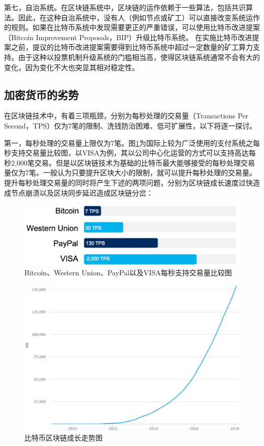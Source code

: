 				第七，自治系统。在区块链系统中，区块链的运作依赖于一些算法，包括共识算法。因此，在这种自治系统中，没有人（例如节点或矿工）可以直接改变系统运作的规则。如果在比特币系统中发现需要更正的严重错误，可以使用比特币改进提案（Bitcoin Improvement Proposals，BIP）\supercite{BitcoinImprovementProposals}升级比特币系统。 在实施比特币改进提案之前，提议的比特币改进提案需要得到比特币系统中超过一定数量的矿工算力支持。由于这种以投票机制升级系统的门槛相当高，使得区块链系统通常不会有大的变化，因为变化不⼤也突显其相对稳定性。

			\subsection{加密货币的劣势}
			在区块链技术中，有着三项瓶颈，分别为每秒处理的交易量（Transactions Per Second，TPS）仅为7笔的限制、洗钱防治困难、低可扩展性，以下将逐一探讨。

				第一，每秒处理的交易量上限仅为7笔。图\ref{TPS}为国际上较为广泛使用的⽀付系统之每秒⽀持交易量⽐较图，以VISA为例，其以公司中心化运营的方式可以支持高达每秒2,000笔交易。但是以区块链技术为基础的比特币最大能够接受的每秒处理交易量仅为7笔。一般认为只要提升区块大小的限制，就可以提升每秒处理的交易量。提升每秒处理交易量的同时将产生下述的两项问题，分别为区块链成长速度过快造成节点崩溃以及区块同步延迟造成区块链分岔：

					\begin{figure}[!htb]
						\centering
						\includegraphics[width = .6\textwidth]{TPS.png}
						\caption{Bitcoin、Western Union\supercite{WesternUnion}、PayPal\supercite{PayPal}以及VISA每秒支持交易量比较图\supercite{digibyte}}\label{TPS}
					\end{figure}

					\begin{figure}[!htb]
						\centering
						\includegraphics[width = .8\textwidth]{blockchainsize.png}
						\caption{比特币区块链成长走势图\supercite{blockchainsize}}\label{blockchainsize}
					\end{figure}


